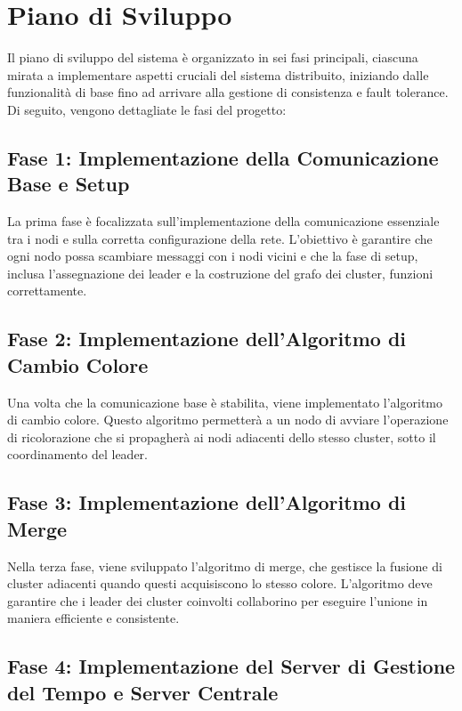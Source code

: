 \documentclass[12pt, a4paper]{report}
\begin{document}
\section{Piano di Sviluppo}

Il piano di sviluppo del sistema \`e organizzato in sei fasi principali, ciascuna mirata a implementare aspetti cruciali del sistema distribuito, iniziando dalle funzionalit\`a di base fino ad arrivare alla gestione di consistenza e fault tolerance. Di seguito, vengono dettagliate le fasi del progetto:

\subsection*{Fase 1: Implementazione della Comunicazione Base e Setup}

La prima fase \`e focalizzata sull'implementazione della comunicazione essenziale tra i nodi e sulla corretta configurazione della rete. L'obiettivo \`e garantire che ogni nodo possa scambiare messaggi con i nodi vicini e che la fase di setup, inclusa l'assegnazione dei leader e la costruzione del grafo dei cluster, funzioni correttamente.

\subsection*{Fase 2: Implementazione dell'Algoritmo di Cambio Colore}

Una volta che la comunicazione base \`e stabilita, viene implementato l'algoritmo di cambio colore. Questo algoritmo permetter\`a a un nodo di avviare l'operazione di ricolorazione che si propagher\`a ai nodi adiacenti dello stesso cluster, sotto il coordinamento del leader.

\subsection*{Fase 3: Implementazione dell'Algoritmo di Merge}

Nella terza fase, viene sviluppato l'algoritmo di merge, che gestisce la fusione di cluster adiacenti quando questi acquisiscono lo stesso colore. L'algoritmo deve garantire che i leader dei cluster coinvolti collaborino per eseguire l'unione in maniera efficiente e consistente.

\subsection*{Fase 4: Implementazione del Server di Gestione del Tempo e Server Centrale}
\end{document}
